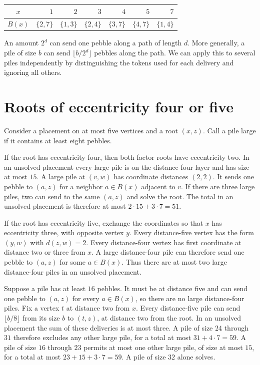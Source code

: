 \documentclass[10pt]{article}
\begin{document}
\begin{center}
\begin{tabular}{c|rrrrrr}
$x$ & $1$ & $2$ & $3$ & $4$ & $5$ & $7$\\
\hline
$B(x)$ & $\{2,7\}$ & $\{1,3\}$ & $\{2,4\}$ & $\{3,7\}$ &
         $\{4,7\}$ & $\{1,4\}$
\end{tabular}
\end{center}

An amount $2^d$ can send one pebble along a path of length $d$.
More generally, a pile of size $b$ can send
$\lfloor b/2^d\rfloor$ pebbles along the path. We can apply this
to several piles independently by distinguishing the tokens used for
each delivery and ignoring all others.

\section{Roots of eccentricity four or five}

Consider a placement on at most five vertices and a root $(x,z)$.
Call a pile large if it contains at least eight pebbles.

If the root has eccentricity four, then both factor roots have
eccentricity two. In an unsolved placement every large pile is on
the distance-four layer and has size at most $15$. A large pile at
$(v,w)$ has coordinate distances $(2,2)$. It sends one pebble to
$(a,z)$ for a neighbor $a\in B(x)$ adjacent to $v$. If there are
three large piles, two can send to the same $(a,z)$ and solve
the root. The total in an unsolved placement is therefore at most
$2\cdot15+3\cdot7=51$.

If the root has eccentricity five, exchange the coordinates so that
$x$ has eccentricity three, with opposite vertex $y$. Every
distance-five vertex has the form $(y,w)$ with $d(z,w)=2$.
Every distance-four vertex has first coordinate at distance two
or three from $x$. A large distance-four pile can therefore send
one pebble to $(a,z)$ for some $a\in B(x)$. Thus there are at most
two large distance-four piles in an unsolved placement.

Suppose a pile has at least $16$ pebbles. It must be at distance
five and can send one pebble to $(a,z)$ for every $a\in B(x)$,
so there are no large distance-four piles. Fix a vertex $t$ at
distance two from $x$. Every distance-five pile can send
$\lfloor b/8\rfloor$ from its size $b$ to $(t,z)$, at distance
two from the root. In an unsolved placement the sum of these
deliveries is at most three. A pile of size $24$ through $31$
therefore excludes any other large pile, for a total at most
$31+4\cdot7=59$. A pile of size $16$ through $23$ permits at
most one other large pile, of size at most $15$, for a total
at most $23+15+3\cdot7=59$. A pile of size $32$ alone solves.
\end{document}
